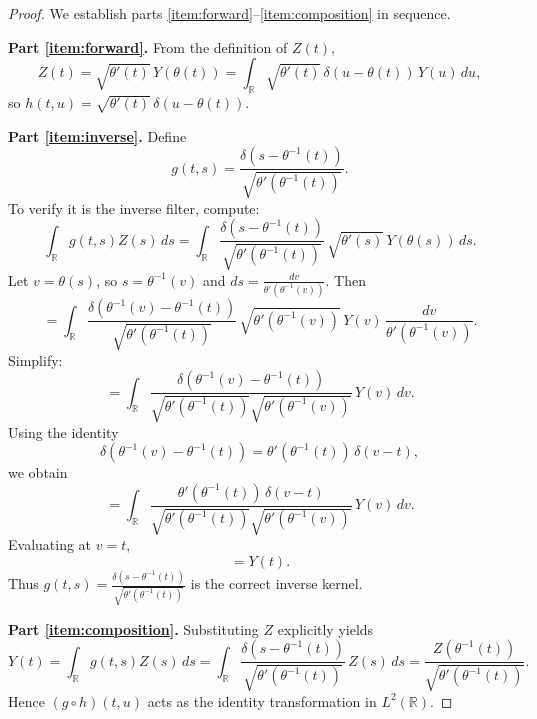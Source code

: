 \documentclass{article}
\begin{document}
\begin{proof}
We establish parts \ref{item:forward}--\ref{item:composition} in sequence.

\textbf{Part \ref{item:forward}.}
From the definition of $Z(t)$,
\[
Z(t) = \sqrt{\theta'(t)} \, Y(\theta(t)) = \int_{\mathbb{R}} \sqrt{\theta'(t)} \, \delta(u - \theta(t)) \, Y(u) \, du,
\]
so $h(t,u) = \sqrt{\theta'(t)} \, \delta(u - \theta(t))$.

\textbf{Part \ref{item:inverse}.}
Define
\[
g(t,s) = \frac{\delta(s - \theta^{-1}(t))}{\sqrt{\theta'(\theta^{-1}(t))}}.
\]
To verify it is the inverse filter, compute:
\[
\int_{\mathbb{R}} g(t,s) Z(s) \, ds
  = \int_{\mathbb{R}} \frac{\delta(s - \theta^{-1}(t))}{\sqrt{\theta'(\theta^{-1}(t))}} \, \sqrt{\theta'(s)} \, Y(\theta(s)) \, ds.
\]
Let $v = \theta(s)$, so $s = \theta^{-1}(v)$ and $ds = \frac{dv}{\theta'(\theta^{-1}(v))}$. Then
\[
= \int_{\mathbb{R}} 
  \frac{\delta(\theta^{-1}(v) - \theta^{-1}(t))}{\sqrt{\theta'(\theta^{-1}(t))}} \,
  \sqrt{\theta'(\theta^{-1}(v))} \,
  Y(v) \,
  \frac{dv}{\theta'(\theta^{-1}(v))}.
\]
Simplify:
\[
= \int_{\mathbb{R}} 
  \frac{\delta(\theta^{-1}(v) - \theta^{-1}(t))}{\sqrt{\theta'(\theta^{-1}(t))}\sqrt{\theta'(\theta^{-1}(v))}} 
  \, Y(v) \, dv.
\]
Using the identity
\[
\delta(\theta^{-1}(v) - \theta^{-1}(t)) = \theta'(\theta^{-1}(t)) \, \delta(v - t),
\]
we obtain
\[
= \int_{\mathbb{R}}
\frac{\theta'(\theta^{-1}(t)) \, \delta(v - t)}{\sqrt{\theta'(\theta^{-1}(t))}\sqrt{\theta'(\theta^{-1}(v))}} \, Y(v) \, dv.
\]
Evaluating at $v = t$,
\[
= Y(t).
\]
Thus $g(t,s) = \frac{\delta(s - \theta^{-1}(t))}{\sqrt{\theta'(\theta^{-1}(t))}}$ is the correct inverse kernel.

\textbf{Part \ref{item:composition}.}
Substituting $Z$ explicitly yields
\[
Y(t)
  = \int_{\mathbb{R}} g(t,s) Z(s) \, ds
  = \int_{\mathbb{R}} \frac{\delta(s - \theta^{-1}(t))}{\sqrt{\theta'(\theta^{-1}(t))}} \, Z(s) \, ds
  = \frac{Z(\theta^{-1}(t))}{\sqrt{\theta'(\theta^{-1}(t))}}.
\]
Hence $(g \circ h)(t,u)$ acts as the identity transformation in $L^2(\mathbb{R})$.
\end{proof}
\end{document}
